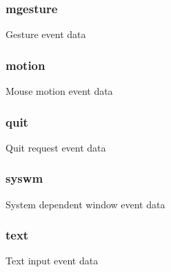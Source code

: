 \subsubsection[{\texorpdfstring{mgesture}{mgesture}}]{ mgesture}\hypertarget{union_s_d_l___event_aa0605c4f966521b135a1a429a2a255f4}{}\label{union_s_d_l___event_aa0605c4f966521b135a1a429a2a255f4}
Gesture event data 
\subsubsection[{\texorpdfstring{motion}{motion}}]{ motion}\hypertarget{union_s_d_l___event_a8b74ec063362bbd2e4ec6d1a878eb0ca}{}\label{union_s_d_l___event_a8b74ec063362bbd2e4ec6d1a878eb0ca}
Mouse motion event data 
\subsubsection[{\texorpdfstring{quit}{quit}}]{ quit}\hypertarget{union_s_d_l___event_a08f33cf663e5a5227cc5b681017af20c}{}\label{union_s_d_l___event_a08f33cf663e5a5227cc5b681017af20c}
Quit request event data 
\subsubsection[{\texorpdfstring{syswm}{syswm}}]{ syswm}\hypertarget{union_s_d_l___event_a97fa33bbc633db23ef6e2df72ad7d7d2}{}\label{union_s_d_l___event_a97fa33bbc633db23ef6e2df72ad7d7d2}
System dependent window event data 
\subsubsection[{\texorpdfstring{text}{text}}]{ text}\hypertarget{union_s_d_l___event_aa5ef1fa3d7a6b36ccac384be7051491a}{}\label{union_s_d_l___event_aa5ef1fa3d7a6b36ccac384be7051491a}
Text input event data 
